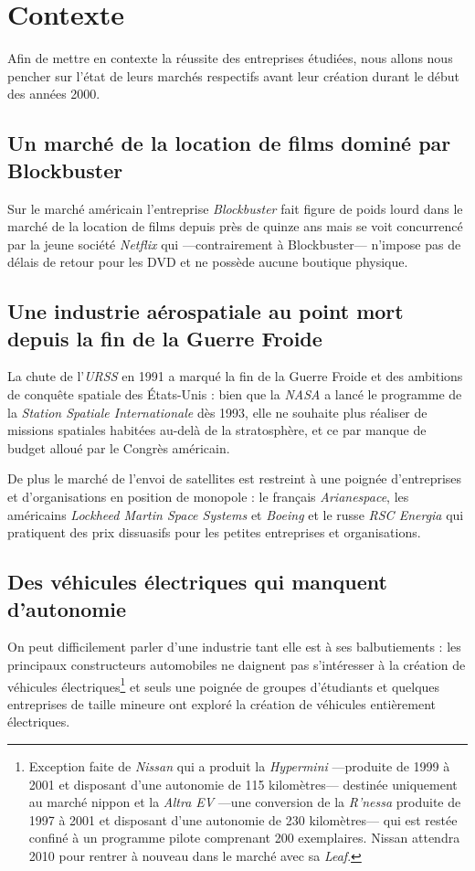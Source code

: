 \chapter{Contexte}

Afin de mettre en contexte la réussite des entreprises étudiées, nous allons nous pencher sur l'état de leurs marchés respectifs avant leur création durant le début des années 2000.

\section{Un marché de la location de films dominé par Blockbuster}

Sur le marché américain l'entreprise \textit{Blockbuster} fait figure de poids lourd dans le marché de la location de films depuis près de quinze ans mais se voit concurrencé par la jeune société \textit{Netflix} qui ---contrairement à Blockbuster--- n'impose pas de délais de retour pour les DVD et ne possède aucune boutique physique. 

\section{Une industrie aérospatiale au point mort depuis la fin de la Guerre Froide}

La chute de l'\textit{URSS} en 1991 a marqué la fin de la Guerre Froide et des ambitions de conquête spatiale des États-Unis : bien que la \textit{NASA} a lancé le programme de la \textit{Station Spatiale Internationale} dès 1993, elle ne souhaite plus réaliser de missions spatiales habitées au-delà de la stratosphère, et ce par manque de budget alloué par le Congrès américain. 

De plus le marché de l'envoi de satellites est restreint à une poignée d'entreprises et d'organisations en position de monopole : le français \textit{Arianespace}, les américains \textit{Lockheed Martin Space Systems} et \textit{Boeing} et le russe \textit{RSC Energia} qui pratiquent des prix dissuasifs pour les petites entreprises et organisations.

\section{Des véhicules électriques qui manquent d'autonomie}

On peut difficilement parler d'une industrie tant elle est à ses balbutiements : les principaux constructeurs automobiles ne daignent pas s'intéresser à la création de véhicules électriques\footnote{Exception faite de \textit{Nissan} qui a produit la \textit{Hypermini} ---produite de 1999 à 2001 et disposant d'une autonomie de 115 kilomètres--- destinée uniquement au marché nippon et la \textit{Altra EV} ---une conversion de la \textit{R'nessa} produite de 1997 à 2001 et disposant d'une autonomie de 230 kilomètres--- qui est restée confiné à un programme pilote comprenant 200 exemplaires. Nissan attendra 2010 pour rentrer à nouveau dans le marché avec sa \textit{Leaf}.} et seuls une poignée de groupes d'étudiants et quelques entreprises de taille mineure ont exploré la création de véhicules entièrement électriques.

